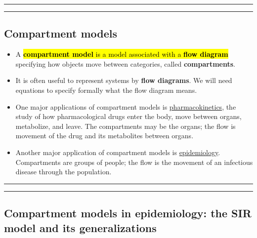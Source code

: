 \documentclass[]{article}
\begin{document}
\begin{center}\rule{0.5\linewidth}{\linethickness}\end{center}

\begin{center}\rule{0.5\linewidth}{\linethickness}\end{center}

\subsection{Compartment models}\label{compartment-models}

\begin{itemize}
\item
  A \hl{\textbf{compartment model} is a model associated with a \textbf{flow
  diagram}} specifying how objects move between categories, called
  \textbf{compartments}.
\item
  It is often useful to represent systems by \textbf{flow diagrams}. We
  will need equations to specify formally what the flow diagram means.
\item
  One major applications of compartment models is
  \href{https://en.wikipedia.org/wiki/Pharmacokinetics}{pharmacokinetics},
  the study of how pharmacological drugs enter the body, move between
  organs, metabolize, and leave. The compartments may be the organs; the
  flow is movement of the drug and its metabolites between organs.
\item
  Another major application of compartment models is
  \href{https://en.wikipedia.org/wiki/Compartmental_models_in_epidemiology}{epidemiology}.
  Compartments are groups of people; the flow is the movement of an
  infectious disease through the population.
\end{itemize}

\begin{center}\rule{0.5\linewidth}{\linethickness}\end{center}

\begin{center}\rule{0.5\linewidth}{\linethickness}\end{center}

\subsection{Compartment models in epidemiology: the SIR model and its
generalizations}\label{compartment-models-in-epidemiology-the-sir-model-and-its-generalizations}
\end{document}
